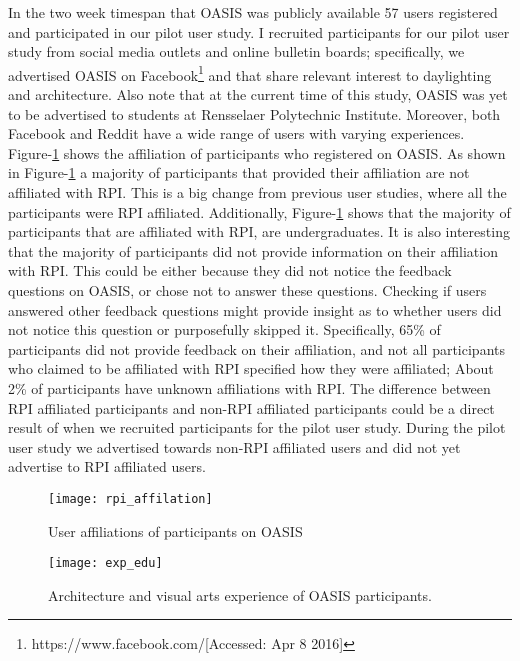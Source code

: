 In the two week timespan that OASIS was publicly available 57 users registered and participated in our pilot user study.  I recruited participants for our pilot user study from social media outlets and online bulletin boards; specifically, we advertised OASIS on Facebook\footnote{https://www.facebook.com/[Accessed: Apr 8 2016]} and that share relevant interest to daylighting and architecture. Also note that at the  current time of this study, OASIS was yet to be advertised to students at Rensselaer Polytechnic Institute. Moreover, both Facebook and Reddit have a wide range of users with varying experiences.  Figure-\ref{fig:rpi_affilation} shows the affiliation of participants who registered on OASIS.  As shown in Figure-\ref{fig:rpi_affilation} a majority of participants that provided their affiliation are not affiliated with RPI.  This is a big change from previous user studies, where all the participants were RPI affiliated.  Additionally, Figure-\ref{fig:rpi_affilation} shows that the majority of participants that are affiliated with RPI, are undergraduates.  It is also interesting that the majority of participants did not provide information on their affiliation with RPI.  This could be either because they did not notice the feedback questions on OASIS, or chose not to answer these questions.  Checking if users answered other feedback questions might provide insight as to whether users did not notice this question or purposefully skipped it.  Specifically, 65\% of participants did not provide feedback on their affiliation, and not all participants who claimed to be affiliated with RPI specified how they were affiliated; About 2\% of participants have unknown affiliations with RPI.  The difference between RPI affiliated participants and non-RPI affiliated participants could be a direct result of when we recruited participants for the pilot user study.  During the pilot user study we advertised towards non-RPI affiliated users and did not yet advertise to RPI affiliated users.  \\

\begin{figure}[!ht]
\centering
\texttt{[image: rpi\_affilation]}
\caption{User affiliations of participants on OASIS}
\label{fig:rpi_affilation}
\end{figure}

\begin{figure}[!ht]
\centering
\texttt{[image: exp\_edu]}
\caption{Architecture and visual arts experience of OASIS participants.}
\label{fig:exp_edu}
\end{figure}

